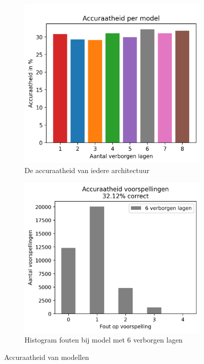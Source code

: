 \begin{figure}[H]
    \begin{subfigure}{.45\textwidth}
        \centering
        \includegraphics[width=1\linewidth]{fig/chapt5/predictor/accuracy_per_model.png}
        \caption{De accuraatheid van iedere architectuur}
        \label{fig:chapt5_accuracy_all_architectures}
    \end{subfigure}
    \begin{subfigure}{.45\textwidth}
        \centering
        \includegraphics[width=1\linewidth]{fig/chapt5/predictor/accuracy_32.12_6_layers_hist.png}
        \caption{Histogram fouten bij model met 6 verborgen lagen}
        \label{fig:chapt5_accuracy_6_layers}
    \end{subfigure}
    \caption{Accuraatheid van modellen}
    \label{fig:chapt5_accuracy_architectures}
\end{figure}


